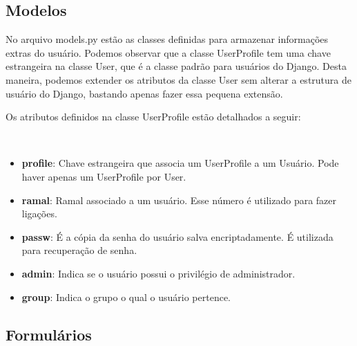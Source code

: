 \documentclass[letterpaper,10pt,brazil]{sphinxmanual}
\begin{document}
\subsection{Modelos}
\label{apps/accounts:module-accounts.models}\label{apps/accounts:modelos}
No arquivo models.py estão as classes definidas para armazenar informações extras do usuário. Podemos observar que a classe UserProfile tem uma chave estrangeira na classe User, que é a classe padrão para usuários do Django. Desta maneira, podemos extender os atributos da classe User sem alterar a estrutura de usuário do Django, bastando apenas fazer essa pequena extensão.

Os atributos definidos na classe UserProfile estão detalhados a seguir:

\begin{fulllineitems}
\label{apps/accounts:accounts.models.UserProfile}~\begin{itemize}
\item {} 
\textbf{profile}: Chave estrangeira que associa um UserProfile a um Usuário. Pode haver apenas um UserProfile por User.

\item {} 
\textbf{ramal}: Ramal associado a um usuário. Esse número é utilizado para fazer ligações.

\item {} 
\textbf{passw}: É a cópia da senha do usuário salva encriptadamente. É utilizada para recuperação de senha.

\item {} 
\textbf{admin}: Indica se o usuário possui o privilégio de administrador.

\item {} 
\textbf{group}: Indica o grupo o qual o usuário pertence.

\end{itemize}

\end{fulllineitems}



\subsection{Formulários}
\label{apps/accounts:module-accounts.forms}\label{apps/accounts:formularios}
\end{document}
